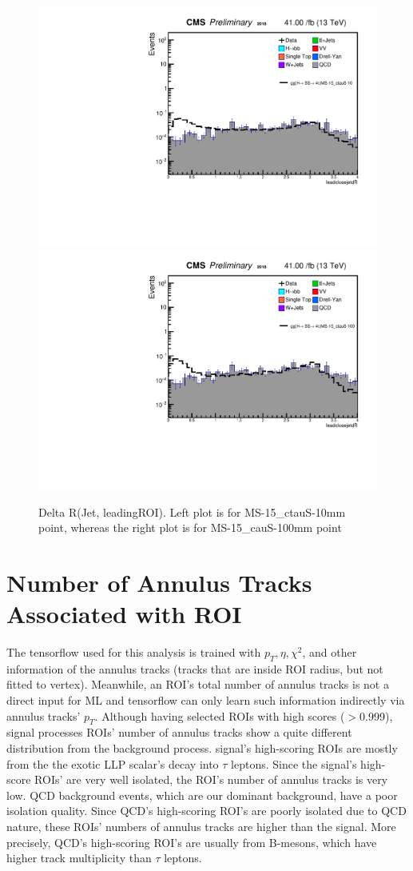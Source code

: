  \begin{figure}[h!]
   \caption{Delta R(Jet, leadingROI). Left plot is for MS-15\_ctauS-10mm point, whereas the right plot is for MS-15\_cauS-100mm point}
   \label{fig:ANleadSize}
   \centering
   \includegraphics[width=0.47\linewidth]{figs/AnalysisNoteplot_MS-15_ctauS-10_leadclosejetdR.pdf}
   \includegraphics[width=0.47\linewidth]{figs/AnalysisNoteplot_MS-15_ctauS-100_leadclosejetdR.pdf}
 \end{figure}


\section{Number of Annulus Tracks Associated with ROI}
 The tensorflow used for this analysis is trained with $p_T, \eta, \chi^{2}$, and other information of the annulus tracks (tracks that are inside ROI radius, but not fitted to vertex).
Meanwhile, an ROI's total number of annulus tracks is not a direct input for ML and tensorflow can only learn such information indirectly via annulus tracks' $p_T$.
Although having selected ROIs with high scores ($>$0.999), signal processes ROIs' number of annulus tracks show a quite different distribution from the background process.
signal's high-scoring ROIs are mostly from the the exotic LLP scalar's decay into $\tau$ leptons. 
Since the signal's high-score ROIs' are very well isolated, the ROI's number of annulus tracks is very low.
QCD background events, which are our dominant background, have a poor isolation quality.
Since QCD's high-scoring ROI's are poorly isolated due to QCD nature, these ROIs' numbers of annulus tracks are higher than the signal.
More precisely, QCD's high-scoring ROI's are usually from B-mesons, which have higher track multiplicity than $\tau$ leptons.


